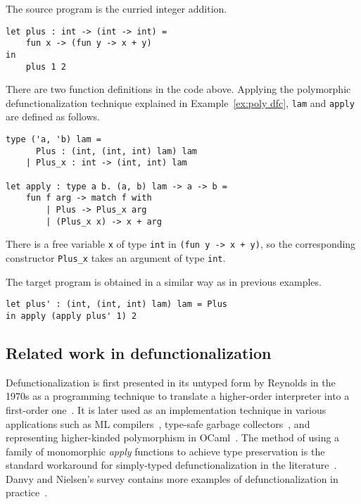 \begin{exmp}
\label{ex:full dfc}
The source program is the curried integer addition.
\begin{lstlisting}
let plus : int -> (int -> int) = 
    fun x -> (fun y -> x + y)
in
    plus 1 2
\end{lstlisting}
There are two function definitions in the code above. Applying the polymorphic defunctionalization technique explained in Example~\ref{ex:poly dfc}, \texttt{lam} and \texttt{apply} are defined as follows.
\begin{lstlisting}
type ('a, 'b) lam = 
      Plus : (int, (int, int) lam) lam
    | Plus_x : int -> (int, int) lam

let apply : type a b. (a, b) lam -> a -> b =
    fun f arg -> match f with
        | Plus -> Plus_x arg
        | (Plus_x x) -> x + arg
\end{lstlisting}
There is a free variable \texttt{x} of type \texttt{int} in \texttt{(fun y -> x + y)}, so the corresponding constructor \texttt{Plus\_x} takes an argument of type \texttt{int}.

The target program is obtained in a similar way as in previous examples.
\begin{lstlisting}
let plus' : (int, (int, int) lam) lam = Plus
in apply (apply plus' 1) 2
\end{lstlisting}

\end{exmp}

\subsection{Related work in defunctionalization}

Defunctionalization is first presented in its untyped form by Reynolds in the 1970s as a programming technique to translate a higher-order interpreter into a first-order one~\cite{DBLP:conf/acm/Reynolds72}. It is later used as an implementation technique in various applications such as ML compilers~\cite{DBLP:journals/lisp/ChinD96,DBLP:conf/esop/CejtinJW00}, type-safe garbage collectors~\cite{DBLP:conf/popl/WangA01}, and representing higher-kinded polymorphism in OCaml~\cite{DBLP:conf/flops/YallopW14}. The method of using a family of monomorphic \textit{apply} functions to achieve type preservation is the standard workaround for simply-typed defunctionalization in the literature~\cite{DBLP:conf/icfp/BellBH97,DBLP:journals/jfp/TolmachO98,DBLP:conf/esop/CejtinJW00,nielsen2000denotational}. Danvy and Nielsen’s survey contains more examples of defunctionalization in practice~\cite{DBLP:conf/ppdp/DanvyN01}.

